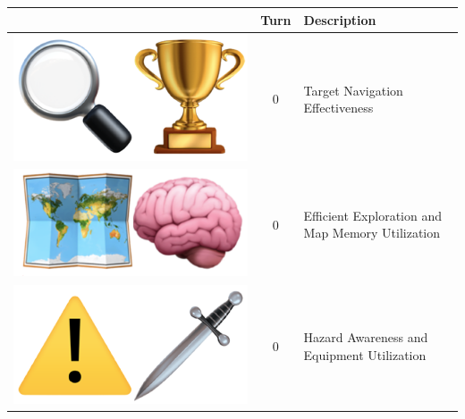 

\begin{table}[ht]
\centering
\begin{tabular}{|c|c|l|}
\hline
\textbf{} & \textbf{Turn} & \textbf{Description} \\
\hline
\rowcolor{gray!10} \includegraphics[scale=0.07]{figs/emojis/mini_1.png} & 0 & Target Navigation Effectiveness \\
\hline
\rowcolor{gray!10} \includegraphics[scale=0.07]{figs/emojis/mini_2.png} & 0 & Efficient Exploration and Map Memory Utilization \\
\hline
\rowcolor{gray!10} \includegraphics[scale=0.07]{figs/emojis/mini_3.png} & 0 & Hazard Awareness and Equipment Utilization \\

\end{tabular}
\end{table}
